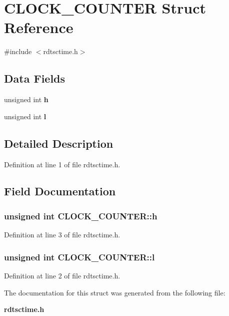 \section{CLOCK\_\-COUNTER Struct Reference}
\label{structCLOCK__COUNTER}


{\ttfamily \#include $<$rdtsctime.h$>$}\subsection*{Data Fields}
\begin{DoxyCompactItemize}
\item 
unsigned int {\bf h}
\item 
unsigned int {\bf l}
\end{DoxyCompactItemize}


\subsection{Detailed Description}


Definition at line 1 of file rdtsctime.h.

\subsection{Field Documentation}
\subsubsection[{h}]{\setlength{\rightskip}{0pt plus 5cm}unsigned int {\bf CLOCK\_\-COUNTER::h}}\label{structCLOCK__COUNTER_af1c6998ca91a29757c47572bbaad51f9}


Definition at line 3 of file rdtsctime.h.
\subsubsection[{l}]{\setlength{\rightskip}{0pt plus 5cm}unsigned int {\bf CLOCK\_\-COUNTER::l}}\label{structCLOCK__COUNTER_ae2b3a01e0f7cc9dbd0e970988e1de517}


Definition at line 2 of file rdtsctime.h.

The documentation for this struct was generated from the following file:\begin{DoxyCompactItemize}
\item 
{\bf rdtsctime.h}\end{DoxyCompactItemize}
